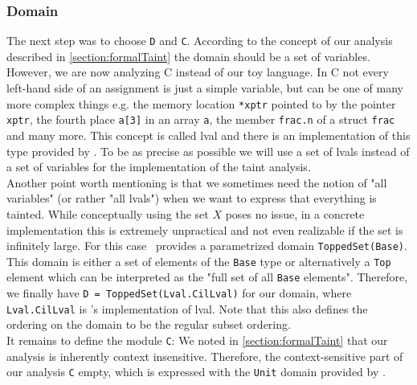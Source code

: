     \subsubsection{Domain}
      The next step was to choose \texttt{D} and \texttt{C}. According to the concept of our analysis described in \autoref{section:formalTaint} the domain should be a set of variables. However, we are now analyzing C instead of our toy language. In C not every left-hand side of an assignment is just a simple variable, but can be one of many more complex things e.g. the memory location \texttt{*xptr} pointed to by the pointer \texttt{xptr}, the fourth place \texttt{a[3]} in an array \texttt{a}, the member \texttt{frac.n} of a struct \texttt{frac} and many more. This concept is called \ac{lval} and there is an implementation of this type provided by \gob. To be as precise as possible we will use a set of \ac{lval}s instead of a set of variables for the implementation of the taint analysis.\\
      Another point worth mentioning is that we sometimes need the notion of "all variables" (or rather "all \ac{lval}s") when we want to express that everything is tainted. While conceptually using the set $X$ poses no issue, in a concrete implementation this is extremely unpractical and not even realizable if the set is infinitely large. For this case \gob\ provides a parametrized domain \texttt{ToppedSet(Base)}. This domain is either a set of elements of the \texttt{Base} type or alternatively a \texttt{Top} element which can be interpreted as the "full set of all \texttt{Base} elements". Therefore, we finally have \texttt{D = ToppedSet(Lval.CilLval)} for our domain, where \texttt{Lval.CilLval} is \gob's implementation of \ac{lval}. Note that this also defines the ordering on the domain to be the regular subset ordering.\\
      It remains to define the module \texttt{C}: We noted in \autoref{section:formalTaint} that our analysis is inherently context insensitive. Therefore, the context-sensitive part of our analysis \texttt{C} empty, which is expressed with the \texttt{Unit} domain provided by \gob.

